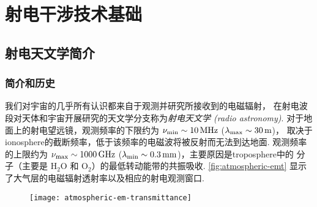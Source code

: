 
\chapter{射电干涉技术基础}
\label{chap:interferometry}

\section{射电天文学简介}
\label{sec:radio-astronomy}

\subsection{简介和历史}

我们对宇宙的几乎所有认识都来自于观测并研究所接收到的电磁辐射，
在射电波段对天体和宇宙开展研究的天文学分支称为\emph{射电天文学 (radio astronomy)}.
对于地面上的射电望远镜，观测频率的下限约为 $\nu_{\R{min}} \sim \SI{10}{\MHz}$
($\lambda_{\mathrm{max}} \sim \SI{30}{\meter}$)，
取决于\ac{ionosphere}的截断频率，低于该频率的电磁波将被反射而无法到达地面.
观测频率的上限约为 $\nu_{\R{max}} \sim \SI{1000}{\GHz}$
($\lambda_{\R{min}} \sim \SI{0.3}{\mm}$)，主要原因是\ac{troposphere}中的
分子（主要是 $\mathrm{H_2 O}$ 和 $\mathrm{O_2}$）的最低转动能带的共振吸收.
\autoref{fig:atmospheric-emt} 显示了大气层的电磁辐射透射率以及相应的射电观测窗口.

\begin{figure}[htp]
  \centering
  \texttt{[image: atmospheric-em-transmittance]}
  \label{fig:atmospheric-emt}
\end{figure}

